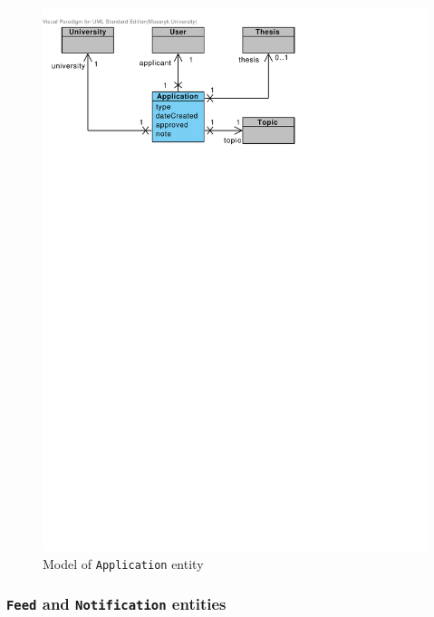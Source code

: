\begin{figure}[h]
    \centering
        \includegraphics[trim=10 630 200 30, clip, keepaspectratio, width=\textwidth]{./images/domain-application-entity.pdf}
    \caption{Model of \texttt{Application} entity}
    \label{fig:domain-application-entity}
\end{figure}

\subsubsection{\texttt{Feed} and \texttt{Notification} entities}

\faketext[2]

